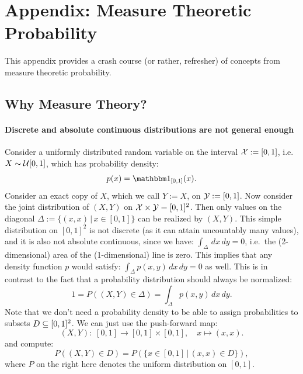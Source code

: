 \section{Appendix: Measure Theoretic Probability}%
\label{app:measure-theory}

This appendix provides a crash course (or rather, refresher) of concepts from measure theoretic probability.

\subsection{Why Measure Theory?}%

%
\paragraph*{Discrete and absolute continuous distributions are not general enough}%

\begin{Eg}%
    Consider a uniformly distributed random variable on the interval $\mathcal{X}:=[0,1]$, i.e.\ $X \sim \mathcal{U}[0,1]$, which has probability density:
    \[ p(x) = \I_{[0,1]}(x).\]
    Consider an exact copy of $X$, which we call $Y:=X$, on $\mathcal{Y} :=[0,1]$. Now consider the joint distribution of $(X,Y)$ 
    on $\mathcal{X} \times \mathcal{Y} = [0,1]^2$.
    Then only values on the diagonal $\Delta:=\{ (x,x) \,|\, x \in [0,1]\}$ can be realized by $(X,Y)$.
    This simple distribution on $[0,1]^2$ is not discrete (as it can attain uncountably many values), and it is also not 
    absolute continuous, since we have: $\int_\Delta \,dx\,dy = 0$, i.e.\ the (2-dimensional) area of the (1-dimensional) line is zero. 
    This implies that any density function $p$ would satisfy: $\int_\Delta p(x,y)\,dx\,dy =0$ as well. This is in contrast to the fact that a probability distribution should always be normalized:
    \[ 1 = P((X,Y) \in \Delta) = \int_\Delta p(x,y)\,dx\,dy.\]
    Note that we don't need a probability density to be able to assign probabilities to subsets $D \subseteq [0,1]^2$.
    We can just use  the push-forward map:
    \[(X,Y):\; [0,1] \to [0,1] \times [0,1], \quad x \mapsto (x,x).\]
    and compute:
    \[P((X,Y) \in D) = P(\{x \in [0,1]\,|\, (x,x) \in D\}),\]
    where $P$ on the right here denotes the uniform distribution on $[0,1]$.
\end{Eg}%

